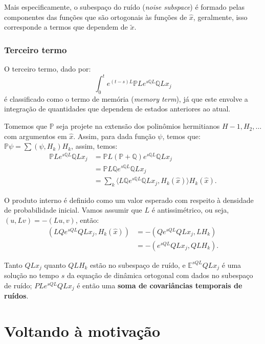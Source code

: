 \documentclass[12pt]{article}
\begin{document}
Mais especificamente, o subespaço do ruído (\textit{noise subspace}) é formado pelas componentes das funções que são ortogonais às funções de $\hat{x}$, geralmente, isso corresponde a termos que dependem de $\tilde{x}$. 

\subsubsection{Terceiro termo}
O terceiro termo, dado por:
\begin{equation*}
	\int_0^t e^{(t-s)L} \mathbb{P}L e^{s\mathbb{Q}L} \mathbb{Q}L x_j
\end{equation*}
é classificado como o termo de memória  (\textit{memory term}), já que este envolve a integração de quantidades que dependem de estados anteriores ao atual.

Tomemos que $\mathbb{P}$ seja projete na extensão dos polinômios hermitianos $H-1, H_2, \ldots$ com argumentos em $\hat{x}$. Assim, para dada função $\psi$, temos que: $\mathbb{P}\psi = \sum (\psi, H_k)H_k$, assim, temos:
\begin{align*}
	\mathbb{P}Le^{s\mathbb{Q}L} \mathbb{Q}Lx_j & = \mathbb{P}L(\mathbb{P} + \mathbb{Q})e^{s\mathbb{Q}L} \mathbb{Q}Lx_j                           \\
	                                           & = \mathbb{P}L\mathbb{Q}e^{s\mathbb{Q}L} \mathbb{Q}Lx_j                                          \\
	                                           & = \sum_k \langle L\mathbb{Q}e^{s\mathbb{Q}L} \mathbb{Q}Lx_j, H_k(\hat{x}) \rangle H_k(\hat{x}). 
\end{align*}

O produto interno é definido como um valor esperado com respeito à densidade de probabilidade inicial. Vamos assumir que $L$ é antissimétrico, ou seja, $(u, Lv) = -(Lu, v)$, então:
\begin{align*}
	(L Q e^{s Q L} Q L x_j, H_k(\hat{x})) 
	  & = - (Q e^{s Q L} Q L x_j, L H_k)  \\
	  & = - (e^{s Q L} Q L x_j, Q L H_k). 
\end{align*}

Tanto $Q L x_j$ quanto $Q L H_k$ estão no subespaço de ruído, e $\mathbb{E}^{s Q L} Q L x_j$ é uma solução no tempo $s$ da equação de dinâmica ortogonal com dados no subespaço de ruído; $P L e^{s Q L} Q L x_j$ é então uma \textbf{soma de covariâncias temporais de ruídos}.

\newpage

\section{Voltando à motivação}
\end{document}
